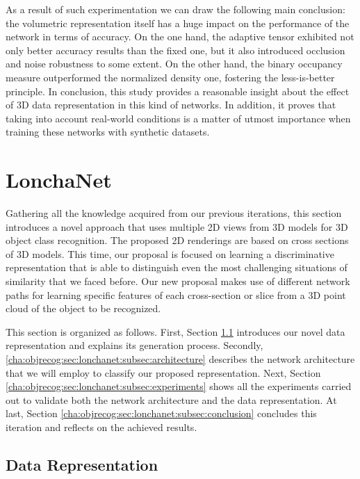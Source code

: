 As a result of such experimentation we can draw the following main conclusion: the volumetric representation itself has a huge impact on the performance of the network in terms of accuracy. On the one hand, the adaptive tensor exhibited not only better accuracy results than the fixed one, but it also introduced occlusion and noise robustness to some extent. On the other hand, the binary occupancy measure outperformed the normalized density one, fostering the less-is-better principle. In conclusion, this study provides a reasonable insight about the effect of \acs{3D} data representation in this kind of networks. In addition, it proves that taking into account real-world conditions is a matter of utmost importance when training these networks with synthetic datasets.

\section{LonchaNet}
\label{cha:objrecog:sec:lonchanet}

Gathering all the knowledge acquired from our previous iterations, this section introduces a novel approach that uses multiple \ac{2D} views from \acs{3D} models for \acs{3D} object class recognition. The proposed \ac{2D} renderings are based on cross sections of \acs{3D} models. This time, our proposal is focused on learning a discriminative representation that is able to distinguish even the most challenging situations of similarity that we faced before. Our new proposal makes use of different network paths for learning specific features of each cross-section or slice from a 3D point cloud of the object to be recognized.

This section is organized as follows. First, Section \ref{cha:objrecog:sec:lonchanet:subsec:representation} introduces our novel data representation and explains its generation process. Secondly, \ref{cha:objrecog:sec:lonchanet:subsec:architecture} describes the network architecture that we will employ to classify our proposed representation. Next, Section \ref{cha:objrecog:sec:lonchanet:subsec:experiments} shows all the experiments carried out to validate both the network architecture and the data representation. At last, Section \ref{cha:objrecog:sec:lonchanet:subsec:conclusion} concludes this iteration and reflects on the achieved results.


\subsection{Data Representation}
\label{cha:objrecog:sec:lonchanet:subsec:representation}

